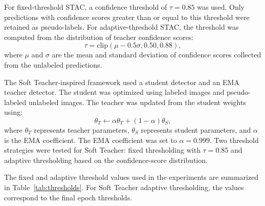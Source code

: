 \documentclass[conference,a4paper]{IEEEtran}
\begin{document}
For fixed-threshold STAC, a confidence threshold of $\tau=0.85$ was used. Only predictions with confidence scores greater than or equal to this threshold were retained as pseudo-labels. For adaptive-threshold STAC, the threshold was computed from the distribution of teacher confidence scores:
\begin{equation}
\tau = \mathrm{clip}(\mu - 0.5\sigma, 0.50, 0.88),
\end{equation}
where $\mu$ and $\sigma$ are the mean and standard deviation of confidence scores collected from the unlabeled predictions.

The Soft Teacher-inspired framework used a student detector and an EMA teacher detector. The student was optimized using labeled images and pseudo-labeled unlabeled images. The teacher was updated from the student weights using:
\begin{equation}
\theta_T \leftarrow \alpha \theta_T + (1-\alpha)\theta_S,
\end{equation}
where $\theta_T$ represents teacher parameters, $\theta_S$ represents student parameters, and $\alpha$ is the EMA coefficient. The EMA coefficient was set to $\alpha=0.999$. Two threshold strategies were tested for Soft Teacher: fixed thresholding with $\tau=0.85$ and adaptive thresholding based on the confidence-score distribution.

The fixed and adaptive threshold values used in the experiments are summarized in Table~\ref{tab:thresholds}. For Soft Teacher adaptive thresholding, the values correspond to the final epoch thresholds.

\begin{table}[!t]
\caption{Fixed and adaptive confidence thresholds used for pseudo-label generation.}
\label{tab:thresholds}
\centering
{}
\end{table}
\end{document}
